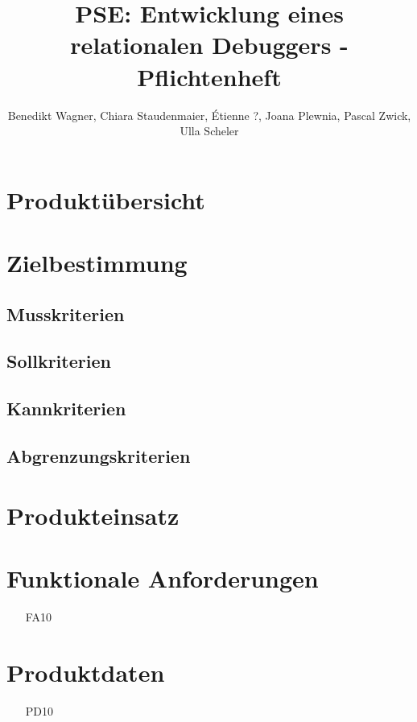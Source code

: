 \documentclass[parskip=full]{scrartcl}
\title{PSE: Entwicklung eines relationalen Debuggers - Pflichtenheft}
\author{Benedikt Wagner, Chiara Staudenmaier, Étienne ?, Joana Plewnia, Pascal Zwick, Ulla Scheler}
\begin{document}
\maketitle

\section{Produktübersicht}

\section{Zielbestimmung}
\subsection{Musskriterien}
\subsection{Sollkriterien}
\subsection{Kannkriterien}
\subsection{Abgrenzungskriterien}

\section{Produkteinsatz}

\section{Funktionale Anforderungen}
\begin{itemize}[nosep]
\item[FA10] %
\end{itemize}

\section{Produktdaten}
\begin{itemize}[nosep]
\item[PD10] %
\end{itemize}
\end{document}
